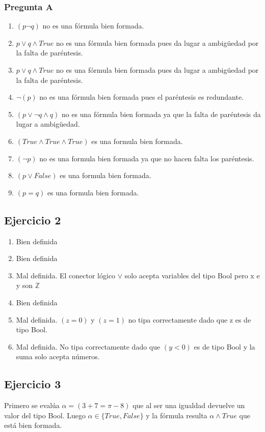 	\subsubsection{Pregunta A}
	\begin{enumerate}[label=(\alph*)]
		\item $(p \neg q)$ no es una fórmula bien formada.
		\item $p \vee q \wedge True$ no es una fórmula bien formada pues da lugar a ambigüedad por la falta de paréntesis.
		\item $p \vee q \wedge True$ no es una fórmula bien formada pues da lugar a ambigüedad por la falta de paréntesis.
		\item $\neg (p)$ no es una fórmula bien formada pues el paréntesis es redundante.
		\item $(p \vee \neg q \wedge q)$ no es una fórmula bien formada ya que la falta de paréntesis da lugar a ambigüedad.
		\item $(True \wedge True \wedge True)$ es una formula bien formada.
		\item $(\neg p)$ no es una formula bien formada ya que no hacen falta los paréntesis.
		\item $(p \vee False)$ es una formula bien formada.
		\item $(p = q)$ es una formula bien formada.
	\end{enumerate}
	
	\subsection{Ejercicio 2}
	\begin{enumerate}[label=(\alph*)]
		\item Bien definida
		\item Bien definida
		\item Mal definida. El conector lógico $\vee$ solo acepta variables del tipo Bool pero x e y son $\mathbb{Z}$ 
		\item Bien definida
		\item Mal definida. $(z = 0)$ y $(z = 1)$ no tipa correctamente dado que z es de tipo Bool.
		\item Mal definida. No tipa correctamente dado que $(y < 0)$ es de tipo Bool y la suma solo acepta números.
	\end{enumerate}
	
	\subsection{Ejercicio 3}
	Primero se evalúa $ \alpha = (3+7 = \pi - 8)$ que al ser una igualdad devuelve un valor del tipo Bool. Luego $\alpha \in \{True, False\}$
	y la fórmula resulta $\alpha \wedge True$ que está bien formada.
	
